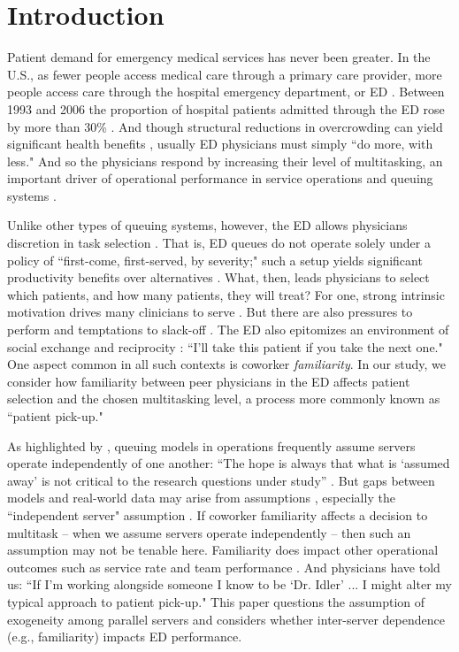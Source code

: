 \section{Introduction} 
 Patient demand for emergency medical services has never been greater. In the U.S., as fewer people access medical care through a primary care provider, more people access care through the hospital emergency department, or ED \citep{Greenwood-Ericksen2019,Ganguli2020}. Between 1993 and 2006 the proportion of hospital patients admitted through the ED rose by more than 30\% \citep{Schurr2012}. And though structural reductions in overcrowding can yield significant health benefits \citep{Woodworth2019}, usually ED physicians must simply “do more, with less." And so the physicians respond by increasing their level of multitasking, an important driver of operational performance in service operations and queuing systems \citep[][]{KC2014,KC2020_productivity}.
 
 Unlike other types of queuing systems, however, the ED allows physicians discretion in task selection \citep{KC2020_tcp}. That is, ED queues do not operate solely under a policy of “first-come, first-served, by severity;" such a setup yields significant productivity benefits over alternatives \citep{Chan2016}. What, then, leads physicians to select which patients, and how many patients, they will treat? For one, strong intrinsic motivation drives many clinicians to serve \citep{Madara2015}. But there are also pressures to perform \citep{Mas2009} and temptations to slack-off \citep{Karau1993}. The ED also epitomizes an environment of social exchange \citep{Homans1961,Blau1964} and reciprocity \citep{Gouldner1960}: “I'll take this patient if you take the next one." One aspect common in all such contexts is coworker \textit{familiarity}. In our study, we consider how familiarity between peer physicians in the ED affects patient selection and the chosen multitasking level, a process more commonly known as “patient pick-up."
 
 As highlighted by \cite{Boudreau2003}, queuing models in operations frequently assume servers operate independently of one another: “The hope is always that what is ‘assumed away’ is not critical to the research questions under study” \citep[p. 740]{Bendoly2006}. But gaps between models and real-world data \citep[e.g.,][]{Ouyang2021} may arise from assumptions \citep{Bendoly2010}, especially the “independent server" assumption \citep{Schultz1997}. If coworker familiarity affects a decision to multitask -- when we assume servers operate independently -- then such an assumption may not be tenable here. Familiarity does impact other operational outcomes such as service rate \citep[e.g.,][]{Reagans2005} and team performance \citep[e.g.,][]{Huckman2011}. And physicians have told us: “If I'm working alongside someone I know to be `Dr. Idler' ... I might alter my typical approach to patient pick-up." This paper questions the assumption of exogeneity among parallel servers and considers whether inter-server dependence (e.g., familiarity) impacts ED performance.

